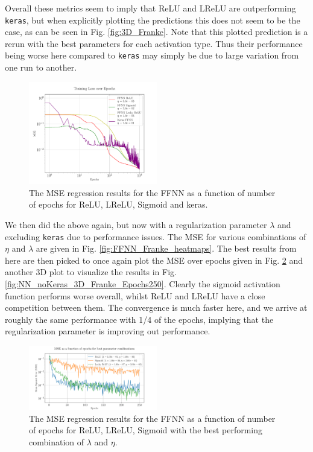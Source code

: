 \documentclass[%
reprint,s
amsmath,amssymb,
aps,
]{revtex4-2}
\begin{document}
Overall these metrics seem to imply that ReLU and LReLU are outperforming \texttt{keras}, but when explicitly plotting the predictions this does not seem to be the case, as can be seen in Fig. \ref{fig:3D_Franke}. Note that this plotted prediction is a rerun with the best parameters for each activation type. Thus their performance being worse here compared to \texttt{keras} may simply be due to large variation from one run to another.
\begin{figure}[ht!]
	\includegraphics[width=0.5\textwidth]{Python/Figures/NN_MSE_Franke_Epoch.pdf}
	\caption{The MSE regression results for the FFNN as a function of number of epochs for ReLU, LReLU, Sigmoid and keras.}
	\label{fig:NN_Franke_Epochs}
\end{figure}

We then did the above again, but now with a regularization parameter $\lambda$ and excluding \texttt{keras} due to performance issues. The MSE for various combinations of $\eta$ and $\lambda$ are given in Fig. \ref{fig:FFNN_Franke_heatmaps}. The best results from here are then picked to once again plot the MSE over epochs given in Fig. \ref{fig:best_MSE_Franke_Epochs} and another 3D plot to visualize the results in Fig. \ref{fig:NN_noKeras_3D_Franke_Epochs250}. Clearly the sigmoid activation function performs worse overall, whilst ReLU and LReLU have a close competition between them. The convergence is much faster here, and we arrive at roughly the same performance with 1/4 of the epochs, implying that the regularization parameter is improving out performance.
\begin{figure}[ht!]
	\includegraphics[width=0.5\textwidth]{Python/Figures/Best_MSE_vs_Epochs.pdf}
	\caption{The MSE regression results for the FFNN as a function of number of epochs for ReLU, LReLU, Sigmoid with the best performing combination of $\lambda$ and $\eta$.}
	\label{fig:best_MSE_Franke_Epochs}
\end{figure}
\end{document}
